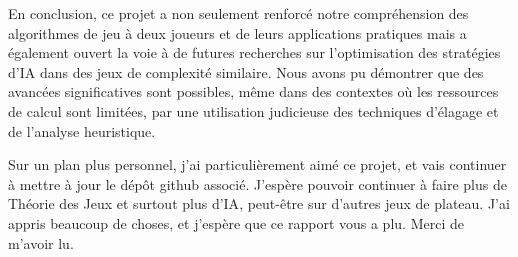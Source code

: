 En conclusion, ce projet a non seulement renforcé notre compréhension des algorithmes de jeu à deux joueurs et de leurs applications pratiques mais a également ouvert la voie à de futures recherches sur l'optimisation des stratégies d'IA dans des jeux de complexité similaire. Nous avons pu démontrer que des avancées significatives sont possibles, même dans des contextes où les ressources de calcul sont limitées, par une utilisation judicieuse des techniques d'élagage et de l'analyse heuristique.

Sur un plan plus personnel, j'ai particulièrement aimé ce projet, et vais continuer à mettre à jour le dépôt github associé. J'espère pouvoir continuer à faire plus de Théorie des Jeux et surtout plus d'\ac{IA}, peut-être sur d'autres jeux de plateau. J'ai appris beaucoup de choses, et j'espère que ce rapport vous a plu. Merci de m'avoir lu.